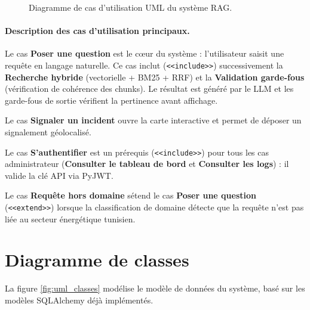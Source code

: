 \documentclass[12pt,a4paper,oneside]{report}
\begin{document}
\begin{figure}[htbp]
{%
}
\caption{Diagramme de cas d'utilisation UML du syst\`{e}me RAG.}
\label{fig:uml_usecase}
\end{figure}

\paragraph{Description des cas d'utilisation principaux.}
Le cas \textbf{Poser une question} est le c\oe{}ur du syst\`{e}me : l'utilisateur saisit une requ\^{e}te en langage naturelle. Ce cas inclut (\texttt{<<include>>}) successivement la \textbf{Recherche hybride} (vectorielle + BM25 + RRF) et la \textbf{Validation garde-fous} (v\'{e}rification de coh\'{e}rence des chunks). Le r\'{e}sultat est g\'{e}n\'{e}r\'{e} par le LLM et les garde-fous de sortie v\'{e}rifient la pertinence avant affichage.

Le cas \textbf{Signaler un incident} ouvre la carte interactive et permet de d\'{e}poser un signalement g\'{e}olocalis\'{e}.

Le cas \textbf{S'authentifier} est un pr\'{e}requis (\texttt{<<include>>}) pour tous les cas administrateur (\textbf{Consulter le tableau de bord} et \textbf{Consulter les logs}) : il valide la cl\'{e} API via PyJWT.

Le cas \textbf{Requ\^{e}te hors domaine} s\'{e}tend le cas \textbf{Poser une question} (\texttt{<<extend>>}) lorsque la classification de domaine d\'{e}tecte que la requ\^{e}te n'est pas li\'{e}e au secteur \'{e}nerg\'{e}tique tunisien.

\section{Diagramme de classes}

La figure \ref{fig:uml_classes} mod\'{e}lise le mod\`{e}le de donn\'{e}es du syst\`{e}me, bas\'{e} sur les mod\`{e}les SQLAlchemy d\'{e}jà impl\'{e}ment\'{e}s.
\end{document}
